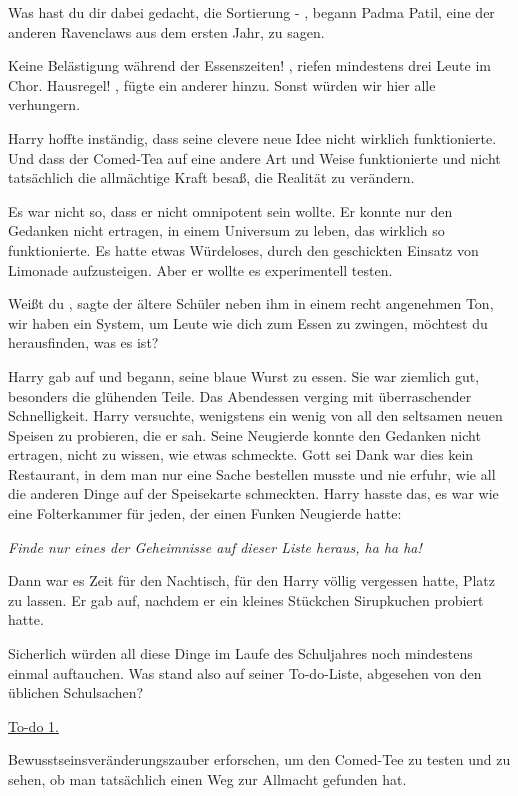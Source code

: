 \glqq Was hast du dir dabei gedacht, die Sortierung -\grqq{} , begann Padma
Patil, eine der anderen Ravenclaws aus dem ersten Jahr, zu sagen.

\glqq Keine Belästigung während der Essenszeiten!\grqq{} , riefen mindestens
drei Leute im Chor. \glqq Hausregel!\grqq{} , fügte ein anderer hinzu. \glqq
Sonst würden wir hier alle verhungern.\grqq{}

Harry hoffte inständig, dass seine clevere neue Idee nicht wirklich
funktionierte. Und dass der Comed-Tea auf eine andere Art und Weise
funktionierte und nicht tatsächlich die allmächtige Kraft besaß, die Realität zu
verändern.

Es war nicht so, dass er nicht omnipotent sein wollte. Er konnte nur den
Gedanken nicht ertragen, in einem Universum zu leben, das wirklich so
funktionierte. Es hatte etwas Würdeloses, durch den geschickten Einsatz von
Limonade aufzusteigen. Aber er wollte es experimentell testen.

\glqq Weißt du\grqq{} , sagte der ältere Schüler neben ihm in einem recht
angenehmen Ton, \glqq wir haben ein System, um Leute wie dich zum Essen zu
zwingen, möchtest du herausfinden, was es ist?\grqq{}

Harry gab auf und begann, seine blaue Wurst zu essen. Sie war ziemlich gut,
besonders die glühenden Teile. Das Abendessen verging mit überraschender
Schnelligkeit. Harry versuchte, wenigstens ein wenig von all den seltsamen neuen
Speisen zu probieren, die er sah. Seine Neugierde konnte den Gedanken nicht
ertragen, nicht zu wissen, wie etwas schmeckte. Gott sei Dank war dies kein
Restaurant, in dem man nur eine Sache bestellen musste und nie erfuhr, wie all
die anderen Dinge auf der Speisekarte schmeckten. Harry hasste das, es war wie
eine Folterkammer für jeden, der einen Funken Neugierde hatte:

\emph{Finde nur eines der Geheimnisse auf dieser Liste heraus, ha ha ha!}

Dann war es Zeit für den Nachtisch, für den Harry völlig vergessen hatte, Platz
zu lassen. Er gab auf, nachdem er ein kleines Stückchen Sirupkuchen probiert
hatte.

Sicherlich würden all diese Dinge im Laufe des Schuljahres noch mindestens
einmal auftauchen. Was stand also auf seiner To-do-Liste, abgesehen von den
üblichen Schulsachen?

\underline{To-do 1.}

Bewusstseinsveränderungszauber erforschen, um den Comed-Tee zu testen und zu
sehen, ob man tatsächlich einen Weg zur Allmacht gefunden hat.

